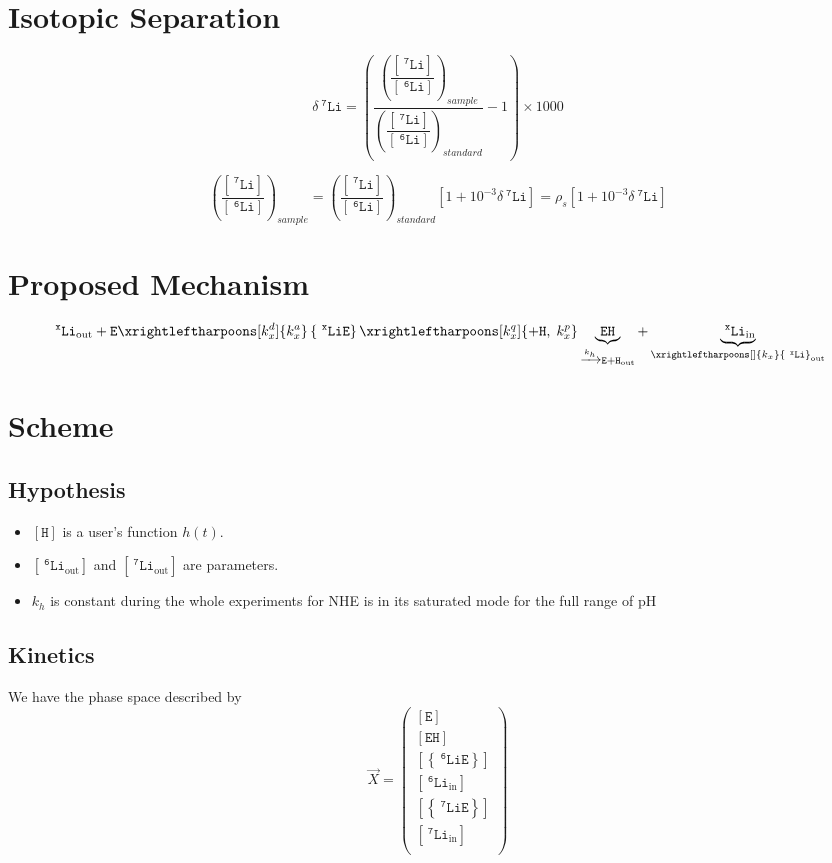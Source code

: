\documentclass[aps,onecolumn,12pt]{revtex4}
\newcommand{\mychem}[1]{\mathtt{#1}}
\newcommand{\myconc}[1]{\left\lbrack{#1}\right\rbrack}
\newcommand{\spLi}[1]{{~^{\mychem{#1}}\mychem{Li}}}
\newcommand{\Li}[1]{\myconc{\spLi{#1}}}
\newcommand{\spEout}{\mychem{E}}
\newcommand{\Eout}{\myconc{\spEout}}
\newcommand{\spLiE}[1]{\left\lbrace\spLi{#1}\spEout\right\rbrace}
\newcommand{\LiE}[1]{\myconc{\spLiE{#1}}}
\newcommand{\spLiIn}[1]{{\spLi{#1}}_{\mathrm{in}}}
\newcommand{\LiIn}[1]{\myconc{\spLiIn{#1}}}
\newcommand{\spLiOut}[1]{{\spLi{#1}}_{\mathrm{out}}}
\newcommand{\LiOut}[1]{\myconc{\spLiOut{#1}}}
\newcommand{\spEHin}{\mychem{EH}}
\newcommand{\EHin}{\myconc{\spEHin}}
\newcommand{\spproton}{\mychem{H}}
\newcommand{\proton}{\myconc{\spproton}}
\newcommand{\deltaLi}{ {\delta\!\!\!\spLi{7}} }
\begin{document}
\section{Isotopic Separation}
$$
	\deltaLi = \left(
		\dfrac{\left(\dfrac{\Li{7}}{\Li{6}}\right)_{sample}}
		{\left(\dfrac{\Li{7}}{\Li{6}}\right)_{standard}}
		 -1 
	\right) \times 1000
$$

$$
	\left(\dfrac{\Li{7}}{\Li{6}}\right)_{sample} = \left(\dfrac{\Li{7}}{\Li{6}}\right)_{standard} \left[1+10^{-3}\deltaLi\right] = \rho_s \left[1+10^{-3}\deltaLi\right]
$$


\section{Proposed Mechanism}

\begin{equation}
	 \spLiOut{x} +  \spEout  
	 \xrightleftharpoons[k_x^d]{k_x^a} 
	 \spLiE{x}
	  \xrightleftharpoons[k_x^q]{\mychem{+H},\;k_x^p} \underbrace{\spEHin}_{\xrightarrow[]{k_h} \mychem{E} + \mychem{H}_{\mathrm{out}}} + \underbrace{\spLiIn{x}}_{\xrightleftharpoons[]{k_x} \spLiOut{x}}
\end{equation}

\section{Scheme}

\subsection{Hypothesis}
\begin{itemize}
\item $\proton$ is a  user's function $h(t)$.
\item $\LiOut{6}$ and  $\LiOut{7}$ are parameters.
\item $k_h$ is constant during the whole experiments for NHE is in its saturated mode for the full range of pH
\end{itemize}

\subsection{Kinetics}
We have the phase space described by
\begin{equation}
 \vec{X} = 
        \begin{pmatrix}
        \Eout\\
        \EHin\\
        \LiE{6}\\
        \LiIn{6}\\
        \LiE{7}\\
        \LiIn{7}\\
        \end{pmatrix}
\end{equation}
\end{document}
